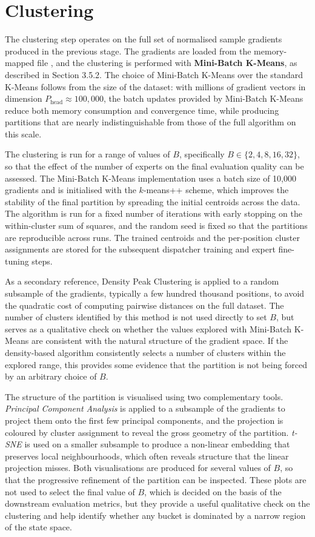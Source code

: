 \section{Clustering}

The clustering step operates on the full set of normalised sample gradients produced in the previous stage. The gradients are loaded from the memory-mapped file , and the clustering is performed with \textbf{Mini-Batch K-Means}, as described in Section 3.5.2. The choice of Mini-Batch K-Means over the standard K-Means follows from the size of the dataset: with millions of gradient vectors in dimension $P_{\text{head}} \approx 100,000$, the batch updates provided by Mini-Batch K-Means reduce both memory consumption and convergence time, while producing partitions that are nearly indistinguishable from those of the full algorithm on this scale.


The clustering is run for a range of values of $B$, specifically $B \in \{2, 4, 8, 16, 32\}$, so that the effect of the number of experts on the final evaluation quality can be assessed. The Mini-Batch K-Means implementation uses a batch size of 10,000 gradients and is initialised with the $k$-means++ scheme, which improves the stability of the final partition by spreading the initial centroids across the data. The algorithm is run for a fixed number of iterations with early stopping on the within-cluster sum of squares, and the random seed is fixed so that the partitions are reproducible across runs. The trained centroids and the per-position cluster assignments are stored for the subsequent dispatcher training and expert fine-tuning steps.

As a secondary reference, Density Peak Clustering is applied to a random subsample of the gradients, typically a few hundred thousand positions, to avoid the quadratic cost of computing pairwise distances on the full dataset. The number of clusters identified by this method is not used directly to set $B$, but serves as a qualitative check on whether the values explored with Mini-Batch K-Means are consistent with the natural structure of the gradient space. If the density-based algorithm consistently selects a number of clusters within the explored range, this provides some evidence that the partition is not being forced by an arbitrary choice of $B$.

The structure of the partition is visualised using two complementary tools. \emph{Principal Component Analysis} is applied to a subsample of the gradients to project them onto the first few principal components, and the projection is coloured by cluster assignment to reveal the gross geometry of the partition. \emph{t-SNE} is used on a smaller subsample to produce a non-linear embedding that preserves local neighbourhoods, which often reveals structure that the linear projection misses. Both visualisations are produced for several values of $B$, so that the progressive refinement of the partition can be inspected. These plots are not used to select the final value of $B$, which is decided on the basis of the downstream evaluation metrics, but they provide a useful qualitative check on the clustering and help identify whether any bucket is dominated by a narrow region of the state space.



